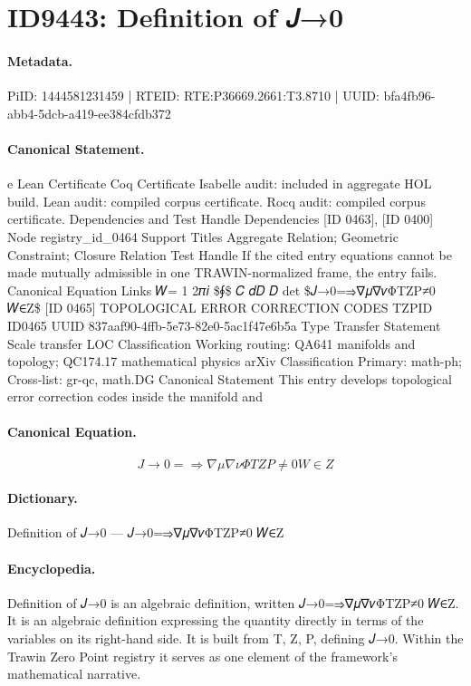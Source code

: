 \section*{ID9443: Definition of 𝐽→0}
\paragraph{Metadata.}
PiID: 1444581231459 | RTEID: RTE:P36669.2661:T3.8710 | UUID: bfa4fb96-abb4-5dcb-a419-ee384cfdb372

\paragraph{Canonical Statement.}
e Lean Certificate Coq Certificate Isabelle audit: included in aggregate HOL build. Lean audit: compiled corpus certificate. Rocq audit: compiled corpus certificate. Dependencies and Test Handle Dependencies [ID 0463], [ID 0400] Node registry\_id\_0464 Support Titles Aggregate Relation; Geometric Constraint; Closure Relation Test Handle If the cited entry equations cannot be made mutually admissible in one TRAWIN-normalized frame, the entry fails. Canonical Equation Links 𝑊= 1 2𝜋𝑖 \$∮\$ 𝐶 𝑑𝐷 𝐷 det \$𝐽→0=⇒∇𝜇∇𝜈ΦTZP≠0 𝑊∈Z\$ [ID 0465] TOPOLOGICAL ERROR CORRECTION CODES TZPID ID0465 UUID 837aaf90-4ffb-5e73-82e0-5ac1f47e6b5a Type Transfer Statement Scale transfer LOC Classification Working routing: QA641 manifolds and topology; QC174.17 mathematical physics arXiv Classification Primary: math-ph; Cross-list: gr-qc, math.DG Canonical Statement This entry develops topological error correction codes inside the manifold and

\paragraph{Canonical Equation.}
\[
𝐽→0=⇒∇𝜇∇𝜈ΦTZP≠0 𝑊∈Z
\]

\paragraph{Dictionary.}
Definition of 𝐽→0 — 𝐽→0=⇒∇𝜇∇𝜈ΦTZP≠0 𝑊∈Z

\paragraph{Encyclopedia.}
Definition of 𝐽→0 is an algebraic definition, written 𝐽→0=⇒∇𝜇∇𝜈ΦTZP≠0 𝑊∈Z. It is an algebraic definition expressing the quantity directly in terms of the variables on its right-hand side. It is built from T, Z, P, defining 𝐽→0. Within the Trawin Zero Point registry it serves as one element of the framework's mathematical narrative.
